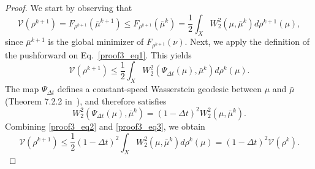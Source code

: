 \documentclass[a4paper, 11pt]{article}
\theoremstyle{plain} %
\begin{document}
	\begin{proof}
		We start by observing that
		\begin{equation}\label{proof3_eq1}
			\mathcal{V}(\rho^{k+1}) = F_{\rho^{k+1}}(\bar{\mu}^{k+1}) \leq F_{\rho^{k+1}}(\bar{\mu}^{k}) = \frac{1}{2}\int_{X}W_{2}^{2}\left( \mu, \bar{\mu}^{k} \right) d\rho^{k+1}(\mu),
 		\end{equation}
		since $ \bar{\mu}^{k+1}$ is the global minimizer of $ F_{\rho^{k+1}}(\nu) $. Next, we apply the definition of the pushforward on Eq.~\eqref{proof3_eq1}. This yields
		\begin{equation}\label{proof3_eq2}
		\mathcal{V}(\rho^{k+1}) \leq \frac{1}{2}\int_{X}W_{2}^{2}\left( \Psi_{\Delta t}(\mu), \bar{\mu}^{k} \right) d\rho^{k}(\mu).
		\end{equation}
		The map $ \Psi_{\Delta t} $ defines a constant-speed Wasserstein geodesic between $ \mu $ and $ \bar{\mu} $ (Theorem 7.2.2 in~\cite{ambrosioGradientFlows2008}), and therefore satisfies
		\begin{equation}\label{proof3_eq3}
			W_{2}^{2}\left( \Psi_{\Delta t}(\mu), \bar{\mu}^{k} \right) = \left( 1 - \Delta t \right)^{2} W_{2}^{2}\left(\mu, \bar{\mu}^{k} \right).
		\end{equation}   
		Combining \eqref{proof3_eq2} and \eqref{proof3_eq3}, we obtain
		\begin{equation}
			\mathcal{V}(\rho^{k+1}) \leq \frac{1}{2}\left( 1 - \Delta t \right)^{2} \int_{X}W_{2}^{2}\left( \mu, \bar{\mu}^{k} \right) d\rho^{k}(\mu) = \left( 1 - \Delta t \right)^{2}\mathcal{V}(\rho^{k}).
		\end{equation}
	\end{proof}
\end{document}
